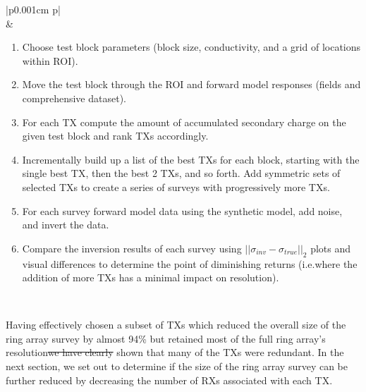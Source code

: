 \documentclass[preprint,authoryear,12pt]{elsarticle}
\providecommand{\DIFaddtex}[1]{{\protect\color{blue}\uwave{#1}}} %
\providecommand{\DIFdeltex}[1]{{\protect\color{red}\sout{#1}}}                      %
\providecommand{\DIFaddbegin}{} %
\providecommand{\DIFaddend}{} %
\providecommand{\DIFdelbegin}{} %
\providecommand{\DIFdelend}{} %
\providecommand{\DIFaddFL}[1]{\DIFadd{#1}} %
\providecommand{\DIFaddbeginFL}{} %
\providecommand{\DIFaddendFL}{} %
\providecommand{\DIFadd}[1]{\texorpdfstring{\DIFaddtex{#1}}{#1}} %
\providecommand{\DIFdel}[1]{\texorpdfstring{\DIFdeltex{#1}}{}} %
\begin{document}
\begin{table}
   \scriptsize
   \begin{tabular} {|p{0.001cm} p{\linewidth}|}
      \hline
       \\
       &
         \begin{enumerate}[leftmargin=*]
            \item Choose test block parameters (block size, conductivity, and a grid of locations within ROI).
            \item Move the test block through the ROI and forward model responses (fields and comprehensive dataset).
            \item For each TX compute the amount of accumulated secondary charge on the given test block and rank TXs accordingly.
            \item Incrementally build up a list of the best TXs for each block, starting with the single best TX, then the best 2 TXs, and so forth. Add symmetric sets of selected TXs to create a series of surveys with progressively more TXs.
            \item For each survey forward model data using the synthetic model, add noise, and invert the data.
            \item Compare the inversion results of each survey using $\left|| \sigma_{inv} - \sigma_{true} \right||_2$ plots and visual differences to determine the point of diminishing returns (i.e.\DIFaddbeginFL \DIFaddFL{,  }\DIFaddendFL where the addition of more TXs has a minimal impact on resolution).
         \end{enumerate} \\
      \hline
   \end{tabular}
   \caption{Workflow summarizing the steps in the TX selection methodology.}
   \label{table:TX_Selection_Methodology}
\end{table}


Having effectively chosen a subset of TXs which reduced the overall size of the ring array survey by almost 94\% but retained most of the full ring array's resolution\DIFdelbegin \DIFdel{we have clearly }\DIFdelend \DIFaddbegin \DIFadd{, we have }\DIFaddend shown that many of the TXs were redundant. In the next section, we set out to determine if the size of the ring array survey can be further reduced by decreasing the number of RXs associated with each TX.
\end{document}
